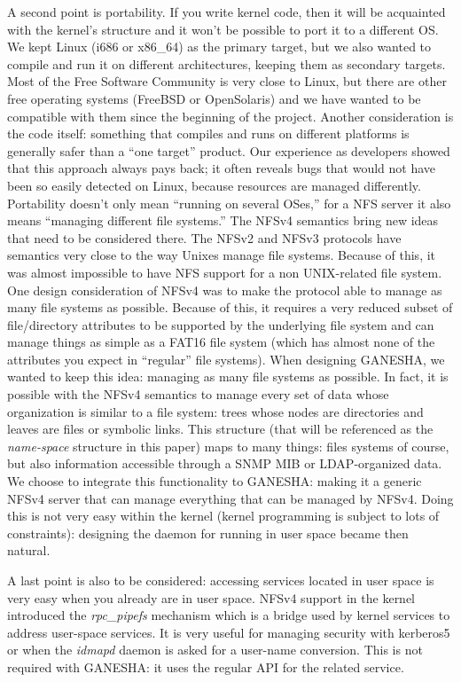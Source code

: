 \documentclass[final]{ols}
\begin{document}
A second point is portability. If you write kernel code, then it will
be acquainted with the kernel's structure and it won't be possible to
port it to a different OS.  We kept Linux (i686 or x86\_64) as the primary
target, but we also wanted to compile and run it on different
architectures, keeping them as secondary targets.  Most of the Free
Software Community is very close to Linux, but there are other free
operating systems (FreeBSD or OpenSolaris) and we have wanted to be
compatible with them since the beginning of the project.  Another
consideration is the code itself: something that compiles and
runs on different platforms is generally safer than a ``one target''
product. Our experience as developers showed that this approach always
pays back; it often reveals bugs that would not have been so easily
detected on Linux, because resources are managed differently.
Portability doesn't only mean ``running on several OSes,'' for a NFS
server it also means ``managing different file systems.'' The NFSv4
semantics bring new ideas that need to be considered there. The NFSv2
and NFSv3 protocols have semantics very close to the way Unixes manage
file systems. Because of this, it was almost impossible to have NFS
support for a non UNIX-related file system. One design consideration
of NFSv4 was to make the protocol able to manage as many file systems
as possible. Because of this, it requires a very reduced subset of
file/\linebreak[0]directory attributes to be supported by the underlying file
system and can manage things as simple as a FAT16 file system (which
has almost none of the attributes you expect in ``regular'' file
systems). When designing GANESHA, we wanted to keep this idea:
managing as many file systems as possible. In fact, it is possible
with the NFSv4 semantics to manage every set of data whose
organization is similar to a file system: trees whose nodes are
directories and leaves are files or symbolic links. This structure
(that will be referenced as the \textit{name-space} structure in this
paper) maps to many things: files systems of course, but also
information accessible through a SNMP MIB or LDAP-organized data. We
choose to integrate this functionality to GANESHA: making it a generic
NFSv4 server that can manage everything that can be managed by NFSv4.
Doing this is not very easy within the kernel (kernel programming is
subject to lots of constraints): designing the daemon for running in
user space became then natural.

A last point is also to be considered: accessing services located in
user space is very easy when you already are in user space. NFSv4
support in the kernel introduced the \textit{rpc\_pipefs} mechanism which
is a bridge used by kernel services to address user-space services. It
is very useful for managing security with kerberos5 or when the 
\textit{idmapd} daemon is asked for a user-name conversion. This is not
required with GANESHA: it uses the regular API for the related
service.
\end{document}
